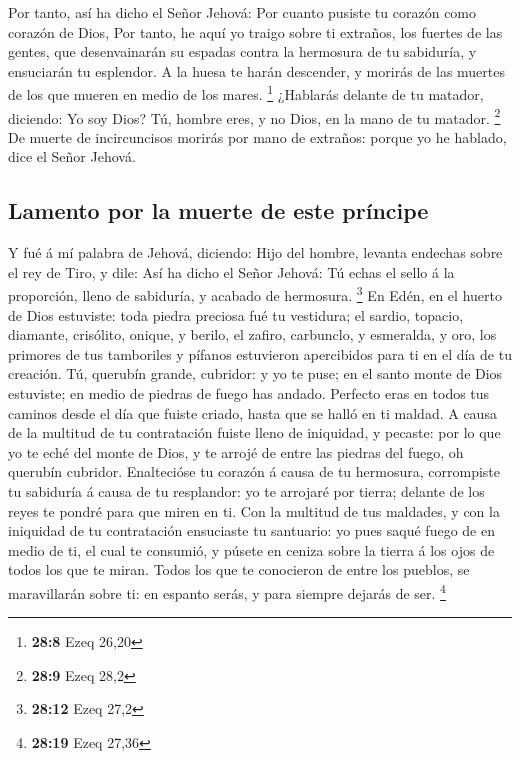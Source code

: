  Por tanto, así ha dicho el Señor Jehová: Por cuanto
pusiste tu corazón como corazón de Dios,  Por tanto, he
aquí yo traigo sobre ti extraños, los fuertes de las gentes, que
desenvainarán su espadas contra la hermosura de tu sabiduría, y
ensuciarán tu esplendor.  A la huesa te harán descender, y
morirás de las muertes de los que mueren en medio de los mares.
\footnote{\textbf{28:8} Ezeq 26,20}  ¿Hablarás delante de
tu matador, diciendo: Yo soy Dios? Tú, hombre eres, y no Dios, en la
mano de tu matador. \footnote{\textbf{28:9} Ezeq 28,2} 
De muerte de incircuncisos morirás por mano de extraños: porque yo he
hablado, dice el Señor Jehová.

\hypertarget{lamento-por-la-muerte-de-este-pruxedncipe}{%
\subsection{Lamento por la muerte de este
príncipe}\label{lamento-por-la-muerte-de-este-pruxedncipe}}

 Y fué á mí palabra de Jehová, diciendo: 
Hijo del hombre, levanta endechas sobre el rey de Tiro, y dile: Así ha
dicho el Señor Jehová: Tú echas el sello á la proporción, lleno de
sabiduría, y acabado de hermosura. \footnote{\textbf{28:12} Ezeq 27,2}
 En Edén, en el huerto de Dios estuviste: toda piedra
preciosa fué tu vestidura; el sardio, topacio, diamante, crisólito,
onique, y berilo, el zafiro, carbunclo, y esmeralda, y oro, los primores
de tus tamboriles y pífanos estuvieron apercibidos para ti en el día de
tu creación.  Tú, querubín grande, cubridor: y yo te
puse; en el santo monte de Dios estuviste; en medio de piedras de fuego
has andado.  Perfecto eras en todos tus caminos desde el
día que fuiste criado, hasta que se halló en ti maldad. 
A causa de la multitud de tu contratación fuiste lleno de iniquidad, y
pecaste: por lo que yo te eché del monte de Dios, y te arrojé de entre
las piedras del fuego, oh querubín cubridor.  Enaltecióse
tu corazón á causa de tu hermosura, corrompiste tu sabiduría á causa de
tu resplandor: yo te arrojaré por tierra; delante de los reyes te pondré
para que miren en ti.  Con la multitud de tus maldades, y
con la iniquidad de tu contratación ensuciaste tu santuario: yo pues
saqué fuego de en medio de ti, el cual te consumió, y púsete en ceniza
sobre la tierra á los ojos de todos los que te miran. 
Todos los que te conocieron de entre los pueblos, se maravillarán sobre
ti: en espanto serás, y para siempre dejarás de ser. \footnote{\textbf{28:19}
  Ezeq 27,36}

